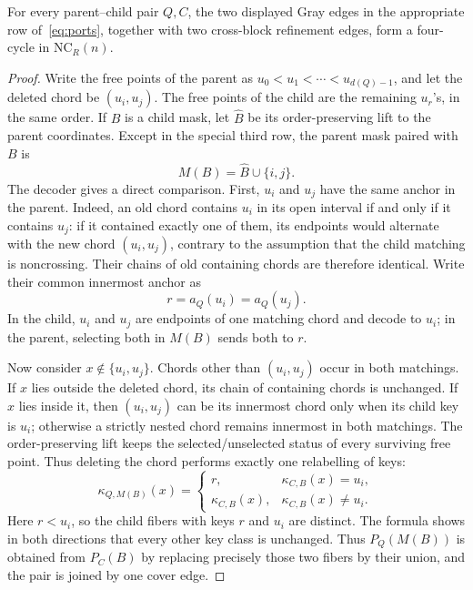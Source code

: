 \documentclass[12pt]{article}
\newcommand{\NCR}{\mathrm{NC}_R}
\begin{document}
\begin{lemma}\label{lem:joining-diamond}
For every parent--child pair $Q,C$, the two displayed Gray edges in the
appropriate row of~\eqref{eq:ports}, together with two cross-block
refinement edges, form a four-cycle in $\NCR(n)$.
\end{lemma}

\begin{proof}
Write the free points of the parent as
$u_0<u_1<\cdots<u_{d(Q)-1}$, and let the deleted chord be
$(u_i,u_j)$.  The free points of the child are the remaining $u_r$'s, in the
same order.  If $B$ is a child mask, let $\widehat B$ be its order-preserving
lift to the parent coordinates.  Except in the special third row, the parent
mask paired with $B$ is
\begin{equation}\label{eq:parent-mask}
 M(B)=\widehat B\cup\{i,j\}.
\end{equation}
The decoder gives a direct comparison.  First, $u_i$ and $u_j$ have the same
anchor in the parent.  Indeed, an old chord contains $u_i$ in its open
interval if and only if it contains $u_j$: if it contained exactly one of
them, its endpoints would alternate with the new chord $(u_i,u_j)$, contrary
to the assumption that the child matching is noncrossing.  Their chains of
old containing chords are therefore identical.  Write their common
innermost anchor as
\[
 r=a_Q(u_i)=a_Q(u_j).
\]
In the child, $u_i$ and $u_j$ are endpoints of one matching chord and decode
to $u_i$; in the parent, selecting both in $M(B)$ sends both to $r$.

Now consider $x\notin\{u_i,u_j\}$.  Chords other than $(u_i,u_j)$ occur in
both matchings.  If $x$ lies outside the deleted chord, its chain of
containing chords is unchanged.  If $x$ lies inside it, then $(u_i,u_j)$ can
be its innermost chord only when its child key is $u_i$; otherwise a strictly
nested chord remains innermost in both matchings.  The order-preserving lift
keeps the selected/unselected status of every surviving free point.  Thus
deleting the chord performs exactly one relabelling of keys:
\[
 \kappa_{Q,M(B)}(x)=
 \begin{cases}
  r,&\kappa_{C,B}(x)=u_i,\\
  \kappa_{C,B}(x),&\kappa_{C,B}(x)\neq u_i.
 \end{cases}
\]
Here $r<u_i$, so the child fibers with keys $r$ and $u_i$ are distinct.  The
formula shows in both directions that every other key class is unchanged.
Thus $P_Q(M(B))$ is obtained from $P_C(B)$ by replacing precisely those two
fibers by their union, and the pair is joined by one cover edge.


\end{proof}
\end{document}
